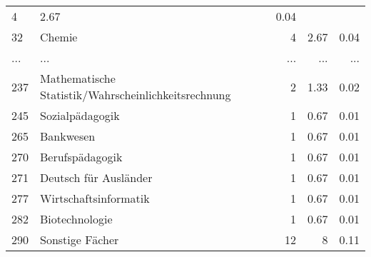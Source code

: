 \begin{longtable}{lXrrr}
          \num{4} &
          \num[round-mode=places,round-precision=2]{2.67} &
          \num[round-mode=places,round-precision=2]{0.04} \\
        32 & \multicolumn{1}{X}{Chemie} & %
          \num{4} &
          \num[round-mode=places,round-precision=2]{2.67} &
          \num[round-mode=places,round-precision=2]{0.04} \\
       ... & ... & ... & ... & ... \\
        237 & \multicolumn{1}{X}{Mathematische Statistik/Wahrscheinlichkeitsrechnung} & %
          \num{2} &
          \num[round-mode=places,round-precision=2]{1.33} &
          \num[round-mode=places,round-precision=2]{0.02} \\

        245 & \multicolumn{1}{X}{Sozialpädagogik} & %
          \num{1} &
          \num[round-mode=places,round-precision=2]{0.67} &
          \num[round-mode=places,round-precision=2]{0.01} \\

        265 & \multicolumn{1}{X}{Bankwesen} & %
          \num{1} &
          \num[round-mode=places,round-precision=2]{0.67} &
          \num[round-mode=places,round-precision=2]{0.01} \\

        270 & \multicolumn{1}{X}{Berufspädagogik} & %
          \num{1} &
          \num[round-mode=places,round-precision=2]{0.67} &
          \num[round-mode=places,round-precision=2]{0.01} \\

        271 & \multicolumn{1}{X}{Deutsch für Ausländer} & %
          \num{1} &
          \num[round-mode=places,round-precision=2]{0.67} &
          \num[round-mode=places,round-precision=2]{0.01} \\

        277 & \multicolumn{1}{X}{Wirtschaftsinformatik} & %
          \num{1} &
          \num[round-mode=places,round-precision=2]{0.67} &
          \num[round-mode=places,round-precision=2]{0.01} \\

        282 & \multicolumn{1}{X}{Biotechnologie} & %
          \num{1} &
          \num[round-mode=places,round-precision=2]{0.67} &
          \num[round-mode=places,round-precision=2]{0.01} \\

        290 & \multicolumn{1}{X}{Sonstige Fächer} & %
          \num{12} &
          \num[round-mode=places,round-precision=2]{8} &
          \num[round-mode=places,round-precision=2]{0.11} \\


\end{longtable}
